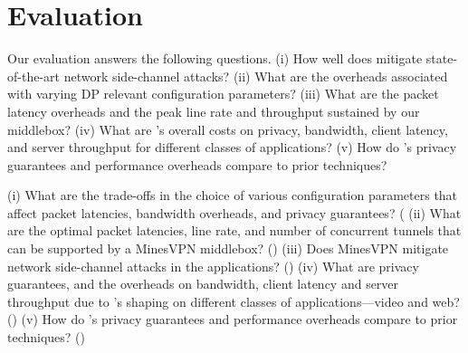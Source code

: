 \section{Evaluation}
\label{sec:eval}

Our evaluation answers the following questions.
(i) How well does {\sys} mitigate state-of-the-art network side-channel attacks?
{(ii) What are the overheads associated with varying DP relevant
configuration parameters?}
(iii) What are the packet latency overheads and the peak line rate and
throughput sustained by our {\sys} middlebox?
(iv) What are {\sys}'s overall costs on privacy, bandwidth, client latency, and
server throughput for different classes of applications?
(v) How do {\sys}'s privacy guarantees and performance overheads compare to
prior techniques?

(i) What are the trade-offs in the choice of various configuration parameters
that affect packet latencies, bandwidth overheads, and privacy guarantees?
(
(ii) What are the optimal packet latencies, line rate, and number of concurrent
tunnels that can be supported by a MinesVPN middlebox?
()
(iii) Does MinesVPN mitigate network side-channel attacks in the applications?
()
(iv) What are privacy guarantees, and the overheads on bandwidth, client latency
and server throughput due to {\sys}'s shaping on different classes of
applications---video and web?  ()
(v) How do {\sys}'s privacy guarantees and performance overheads compare to
prior techniques? ()
\fi

